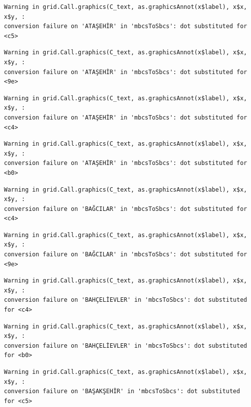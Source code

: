 \documentclass[
  11pt,
  a4paper,
  DIV=11,
  numbers=noendperiod]{scrartcl}
\begin{document}
\begin{verbatim}
Warning in grid.Call.graphics(C_text, as.graphicsAnnot(x$label), x$x, x$y, :
conversion failure on 'ATAŞEHİR' in 'mbcsToSbcs': dot substituted for <c5>
\end{verbatim}

\begin{verbatim}
Warning in grid.Call.graphics(C_text, as.graphicsAnnot(x$label), x$x, x$y, :
conversion failure on 'ATAŞEHİR' in 'mbcsToSbcs': dot substituted for <9e>
\end{verbatim}

\begin{verbatim}
Warning in grid.Call.graphics(C_text, as.graphicsAnnot(x$label), x$x, x$y, :
conversion failure on 'ATAŞEHİR' in 'mbcsToSbcs': dot substituted for <c4>
\end{verbatim}

\begin{verbatim}
Warning in grid.Call.graphics(C_text, as.graphicsAnnot(x$label), x$x, x$y, :
conversion failure on 'ATAŞEHİR' in 'mbcsToSbcs': dot substituted for <b0>
\end{verbatim}

\begin{verbatim}
Warning in grid.Call.graphics(C_text, as.graphicsAnnot(x$label), x$x, x$y, :
conversion failure on 'BAĞCILAR' in 'mbcsToSbcs': dot substituted for <c4>
\end{verbatim}

\begin{verbatim}
Warning in grid.Call.graphics(C_text, as.graphicsAnnot(x$label), x$x, x$y, :
conversion failure on 'BAĞCILAR' in 'mbcsToSbcs': dot substituted for <9e>
\end{verbatim}

\begin{verbatim}
Warning in grid.Call.graphics(C_text, as.graphicsAnnot(x$label), x$x, x$y, :
conversion failure on 'BAHÇELİEVLER' in 'mbcsToSbcs': dot substituted for <c4>
\end{verbatim}

\begin{verbatim}
Warning in grid.Call.graphics(C_text, as.graphicsAnnot(x$label), x$x, x$y, :
conversion failure on 'BAHÇELİEVLER' in 'mbcsToSbcs': dot substituted for <b0>
\end{verbatim}

\begin{verbatim}
Warning in grid.Call.graphics(C_text, as.graphicsAnnot(x$label), x$x, x$y, :
conversion failure on 'BAŞAKŞEHİR' in 'mbcsToSbcs': dot substituted for <c5>
\end{verbatim}
\end{document}
